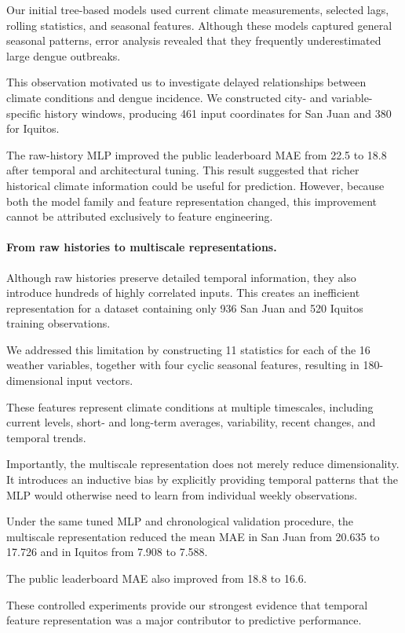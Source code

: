 \documentclass[11pt,a4paper]{article}
\begin{document}
Our initial tree-based models used current climate
measurements, selected lags, rolling statistics, and
seasonal features. Although these models captured
general seasonal patterns, error analysis revealed
that they frequently underestimated large dengue
outbreaks.

This observation motivated us to investigate delayed
relationships between climate conditions and dengue
incidence. We constructed city- and variable-specific
history windows, producing 461 input coordinates for
San Juan and 380 for Iquitos.

The raw-history MLP improved the public leaderboard
MAE from 22.5 to 18.8 after temporal and architectural
tuning. This result suggested that richer historical
climate information could be useful for prediction.
However, because both the model family and feature
representation changed, this improvement cannot be
attributed exclusively to feature engineering.

\paragraph{From raw histories to multiscale representations.}

Although raw histories preserve detailed temporal
information, they also introduce hundreds of highly
correlated inputs. This creates an inefficient
representation for a dataset containing only
936 San Juan and 520 Iquitos training observations.

We addressed this limitation by constructing 11
statistics for each of the 16 weather variables,
together with four cyclic seasonal features,
resulting in 180-dimensional input vectors.

These features represent climate conditions at
multiple timescales, including current levels,
short- and long-term averages, variability,
recent changes, and temporal trends.

Importantly, the multiscale representation
does not merely reduce dimensionality.
It introduces an inductive bias by explicitly
providing temporal patterns that the MLP would
otherwise need to learn from individual weekly
observations.

Under the same tuned MLP and chronological
validation procedure, the multiscale
representation reduced the mean MAE in San Juan
from 20.635 to 17.726 and in Iquitos from
7.908 to 7.588.

The public leaderboard MAE also improved
from 18.8 to 16.6.

These controlled experiments provide our
strongest evidence that temporal feature
representation was a major contributor
to predictive performance.
\end{document}
